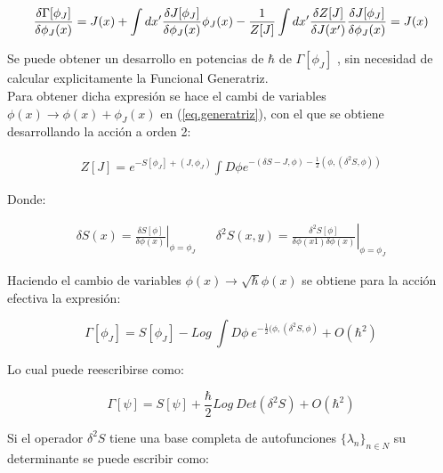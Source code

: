\begin{equation}
\frac{\delta \Gamma [ \phi _J ]}{\delta \phi _J (x) } = 
J(x) + \int dx ' \frac{\delta J [\phi _J ]}{\delta \phi _J (x) } \phi _J (x) - 
\frac{1}{Z[J]} \int dx' \frac{\delta Z[J] }{\delta J(x')} \frac{\delta J[\phi _J ]}{\delta \phi _J (x)} = J(x) \\[8pt]
\end{equation}


Se puede obtener un desarrollo en potencias de $\hbar$ de $\Gamma [ \phi _J]$ , sin necesidad de calcular explicitamente la Funcional Generatriz. \\


Para obtener dicha expresión se hace el cambi de variables $\phi (x) \rightarrow \phi(x) + \phi _J (x) $ en (\ref{eq.generatriz}), con el que se obtiene desarrollando la acción a orden 2:


\begin{equation}
\begin{array}{c}
Z[J] = e ^{-S[ \phi _J ] + (J, \phi _J )} 
\int D \phi e ^{ -(\delta S  - J, \phi ) - \frac{1}{2}  (\phi, (\delta ^2 S, \phi ) ) }
\end{array}
\end{equation}

Donde:

\begin{equation}
\begin{array}{ccc}
\delta S(x) = \left. \frac{\delta S[\phi]}{ \delta \phi (x) } \right| _{\phi = \phi _J} & &
\delta ^2 S(x,y) = \left. \frac{\delta ^2 S[\phi]}{ \delta \phi (x1) \delta \phi (x) } \right| _{\phi = \phi _J}
\end{array}
\end{equation}

Haciendo el cambio de variables $\phi (x) \rightarrow \sqrt{\hbar} \phi (x) $ se obtiene para la acción efectiva la expresión:


\begin{equation}
\Gamma [\phi _J ] = S [ \phi _J ] - Log \ \int D \phi \ e ^{- \frac{1}{2}  (\phi, (\delta ^2 S, \phi) } + O(\hbar ^2)
\end{equation}


Lo cual puede reescribirse como:

\begin{equation}
\Gamma [\psi] = S [\psi] + \frac{\hbar}{2} Log \ Det ( \delta ^2 S ) +
O ( \hbar ^2 )
\end{equation}


Si el operador $ \delta ^2 S $ tiene una base completa de autofunciones $ \{ \lambda _n \} _{n \in N}$ su determinante se puede escribir como:

